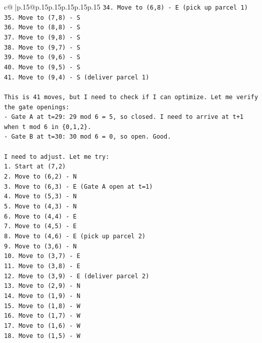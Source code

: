 \documentclass{article}
\begin{document}
{\begin{supertabular}{c@{$\;$}|p{.15\linewidth}@{}p{.15\linewidth}p{.15\linewidth}p{.15\linewidth}p{.15\linewidth}p{.15\linewidth}}
{{{\texttt{34. Move to (6,8) {-} E (pick up parcel 1)} \\
\texttt{35. Move to (7,8) {-} S} \\
\texttt{36. Move to (8,8) {-} S} \\
\texttt{37. Move to (9,8) {-} S} \\
\texttt{38. Move to (9,7) {-} S} \\
\texttt{39. Move to (9,6) {-} S} \\
\texttt{40. Move to (9,5) {-} S} \\
\texttt{41. Move to (9,4) {-} S (deliver parcel 1)} \\
\\ 
\texttt{This is 41 moves, but I need to check if I can optimize. Let me verify the gate openings:} \\
\texttt{{-} Gate A at t=29: 29 mod 6 = 5, so closed. I need to arrive at t+1 when t mod 6 in \{0,1,2\}.} \\
\texttt{{-} Gate B at t=30: 30 mod 6 = 0, so open. Good.} \\
\\ 
\texttt{I need to adjust. Let me try:} \\
\texttt{1. Start at (7,2)} \\
\texttt{2. Move to (6,2) {-} N} \\
\texttt{3. Move to (6,3) {-} E (Gate A open at t=1)} \\
\texttt{4. Move to (5,3) {-} N} \\
\texttt{5. Move to (4,3) {-} N} \\
\texttt{6. Move to (4,4) {-} E} \\
\texttt{7. Move to (4,5) {-} E} \\
\texttt{8. Move to (4,6) {-} E (pick up parcel 2)} \\
\texttt{9. Move to (3,6) {-} N} \\
\texttt{10. Move to (3,7) {-} E} \\
\texttt{11. Move to (3,8) {-} E} \\
\texttt{12. Move to (3,9) {-} E (deliver parcel 2)} \\
\texttt{13. Move to (2,9) {-} N} \\
\texttt{14. Move to (1,9) {-} N} \\
\texttt{15. Move to (1,8) {-} W} \\
\texttt{16. Move to (1,7) {-} W} \\
\texttt{17. Move to (1,6) {-} W} \\
\texttt{18. Move to (1,5) {-} W} \\
}}}
\end{supertabular}}
\end{document}
